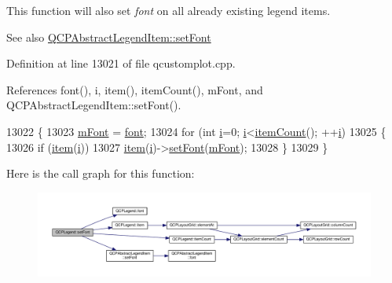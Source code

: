 This function will also set {\itshape font} on all already existing legend items.

\begin{DoxySeeAlso}{See also}
\hyperlink{class_q_c_p_abstract_legend_item_a409c53455d8112f71d70c0c43eb10265}{Q\+C\+P\+Abstract\+Legend\+Item\+::set\+Font} 
\end{DoxySeeAlso}


Definition at line 13021 of file qcustomplot.\+cpp.



References font(), i, item(), item\+Count(), m\+Font, and Q\+C\+P\+Abstract\+Legend\+Item\+::set\+Font().


\begin{DoxyCode}
13022 \{
13023   \hyperlink{class_q_c_p_legend_a56ffacb184a99eefe09a0c7181d0713d}{mFont} = \hyperlink{class_q_c_p_legend_a5cf8b840bc02f7bf4edb8dde400d0f41}{font};
13024   \textcolor{keywordflow}{for} (\textcolor{keywordtype}{int} \hyperlink{_comparision_pictures_2_createtest_image_8m_a6f6ccfcf58b31cb6412107d9d5281426}{i}=0; \hyperlink{_comparision_pictures_2_createtest_image_8m_a6f6ccfcf58b31cb6412107d9d5281426}{i}<\hyperlink{class_q_c_p_legend_a198228e9cdc78d3a3c306fa6763d0404}{itemCount}(); ++\hyperlink{_comparision_pictures_2_createtest_image_8m_a6f6ccfcf58b31cb6412107d9d5281426}{i})
13025   \{
13026     \textcolor{keywordflow}{if} (\hyperlink{class_q_c_p_legend_a454272d7094437beb3278a2294006da5}{item}(\hyperlink{_comparision_pictures_2_createtest_image_8m_a6f6ccfcf58b31cb6412107d9d5281426}{i}))
13027       \hyperlink{class_q_c_p_legend_a454272d7094437beb3278a2294006da5}{item}(\hyperlink{_comparision_pictures_2_createtest_image_8m_a6f6ccfcf58b31cb6412107d9d5281426}{i})->\hyperlink{class_q_c_p_abstract_legend_item_a409c53455d8112f71d70c0c43eb10265}{setFont}(\hyperlink{class_q_c_p_legend_a56ffacb184a99eefe09a0c7181d0713d}{mFont});
13028   \}
13029 \}
\end{DoxyCode}


Here is the call graph for this function\+:\nopagebreak
\begin{figure}[H]
\begin{center}
\leavevmode
\includegraphics[width=350pt]{class_q_c_p_legend_aa4cda8499e3cb0f3be415edc02984c73_cgraph}
\end{center}
\end{figure}


